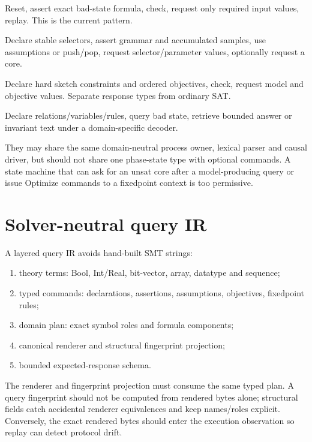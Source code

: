 \documentclass[11pt,oneside]{report}
\begin{document}
\begin{description}[leftmargin=2.2em,style=nextline]
\item[Counterexample protocol.] Reset, assert exact bad-state formula, check, request only required input values, replay. This is the current pattern.
\item[Incremental sketch protocol.] Declare stable selectors, assert grammar and accumulated samples, use assumptions or push/pop, request selector/parameter values, optionally request a core.
\item[Optimization protocol.] Declare hard sketch constraints and ordered objectives, check, request model and objective values. Separate response types from ordinary SAT.
\item[Fixedpoint protocol.] Declare relations/variables/rules, query bad state, retrieve bounded answer or invariant text under a domain-specific decoder.
\end{description}

They may share the same domain-neutral process owner, lexical parser and causal driver, but should not share one phase-state type with optional commands. A state machine that can ask for an unsat core after a model-producing query or issue Optimize commands to a fixedpoint context is too permissive.

\section{Solver-neutral query IR}

A layered query IR avoids hand-built SMT strings:

\begin{enumerate}[leftmargin=2em]
\item theory terms: Bool, Int/Real, bit-vector, array, datatype and sequence;
\item typed commands: declarations, assertions, assumptions, objectives, fixedpoint rules;
\item domain plan: exact symbol roles and formula components;
\item canonical renderer and structural fingerprint projection;
\item bounded expected-response schema.
\end{enumerate}

The renderer and fingerprint projection must consume the same typed plan. A query fingerprint should not be computed from rendered bytes alone; structural fields catch accidental renderer equivalences and keep names/roles explicit. Conversely, the exact rendered bytes should enter the execution observation so replay can detect protocol drift.
\end{document}
